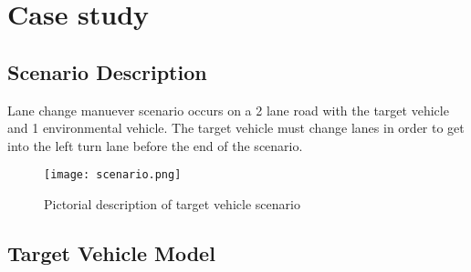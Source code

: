 \section{Case study}
\label{caseStudy}
\subsection{Scenario Description}
Lane change manuever scenario occurs on a 2 lane road with the target vehicle and 1 environmental vehicle. The target vehicle must change lanes in order to get into the left turn lane before the end of the scenario.
\begin{figure}[tb]
	\label{fig:discreteview}
		\texttt{[image: scenario.png]}
	\caption{Pictorial description of target vehicle scenario}
\end{figure}
\subsection{Target Vehicle Model}
